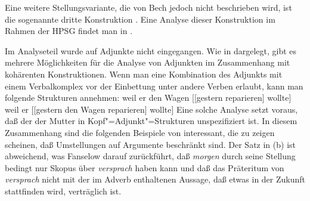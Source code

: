 {{Eine weitere Stellungsvariante, die von Bech jedoch nicht beschrieben wird, ist die sogenannte
dritte Konstruktion \citep*{dBR89}. Eine Analyse dieser Konstruktion im
Rahmen der HPSG findet man in .

Im 
Analyseteil wurde auf Adjunkte nicht eingegangen. Wie in  dargelegt, gibt es
mehrere Möglichkeiten für die Analyse von Adjunkten im Zusammenhang mit kohärenten
Konstruktionen. Wenn man eine Kombination des Adjunkts mit einem Verbalkomplex vor der Einbettung
unter andere Verben erlaubt, kann man folgende Strukturen annehmen:
\eal
\label{anal-adjunct-VP-Einbettung}
\ex weil er den Wagen [[gestern reparieren] wollte]
\ex weil er [[gestern den Wagen reparieren] wollte]
\zl
Eine solche Analyse setzt voraus, daß der \lexw der Mutter in Kopf"=Adjunkt"=Strukturen
unspezifiziert ist. In diesem Zusammenhang sind die folgenden Beispiele von \citet[]{Fanselow2001a} interessant, die zu zeigen scheinen, daß Umstellungen auf Argumente beschränkt
sind.
\eal
\label{bsp-adjunkte-in-kohaerenten-konstr}
\zl
Der Satz in (b) ist abweichend, was Fanselow darauf zurückführt, daß \emph{morgen}
durch seine Stellung bedingt nur Skopus über \emph{versprach} haben kann und daß das
Präteritum von \emph{versprach} nicht mit der im Adverb enthaltenen Aussage, daß etwas in
der Zukunft stattfinden wird, verträglich ist.

}}

